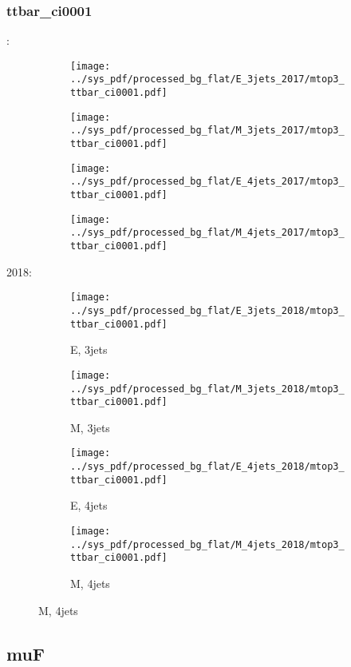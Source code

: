 \documentclass{beamer}
\begin{document}
\begin{frame}
\frametitle{ttbar_ci0001}
\fontsize{5}{1}:
\begin{figure}
\centering
\begin{subfigure}[b]{0.24\textwidth}
\texttt{[image: ../sys\_pdf/processed\_bg\_flat/E\_3jets\_2017/mtop3\_ttbar\_ci0001.pdf]}
\end{subfigure}
\begin{subfigure}[b]{0.24\textwidth}
\texttt{[image: ../sys\_pdf/processed\_bg\_flat/M\_3jets\_2017/mtop3\_ttbar\_ci0001.pdf]}
\end{subfigure}
\begin{subfigure}[b]{0.24\textwidth}
\texttt{[image: ../sys\_pdf/processed\_bg\_flat/E\_4jets\_2017/mtop3\_ttbar\_ci0001.pdf]}
\end{subfigure}
\begin{subfigure}[b]{0.24\textwidth}
\texttt{[image: ../sys\_pdf/processed\_bg\_flat/M\_4jets\_2017/mtop3\_ttbar\_ci0001.pdf]}
\end{subfigure}
\end{figure}
2018:
\begin{figure}
\centering
\begin{subfigure}[b]{0.24\textwidth}
\texttt{[image: ../sys\_pdf/processed\_bg\_flat/E\_3jets\_2018/mtop3\_ttbar\_ci0001.pdf]}
\captionsetup{font=tiny}
\caption{E, 3jets}
\end{subfigure}
\begin{subfigure}[b]{0.24\textwidth}
\texttt{[image: ../sys\_pdf/processed\_bg\_flat/M\_3jets\_2018/mtop3\_ttbar\_ci0001.pdf]}
\captionsetup{font=tiny}
\caption{M, 3jets}
\end{subfigure}
\begin{subfigure}[b]{0.24\textwidth}
\texttt{[image: ../sys\_pdf/processed\_bg\_flat/E\_4jets\_2018/mtop3\_ttbar\_ci0001.pdf]}
\captionsetup{font=tiny}
\caption{E, 4jets}
\end{subfigure}
\begin{subfigure}[b]{0.24\textwidth}
\texttt{[image: ../sys\_pdf/processed\_bg\_flat/M\_4jets\_2018/mtop3\_ttbar\_ci0001.pdf]}
\captionsetup{font=tiny}
\caption{M, 4jets}
\end{subfigure}
\end{figure}
\end{frame}


\subsection{muF}
\end{document}

